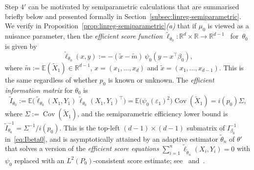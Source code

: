 \documentclass[a4paper]{article}
\newcommand{\R}{\mathbb{R}}
\newcommand{\E}{\mathbb{E}}
\DeclareMathOperator\Cov{Cov}
\theoremstyle{definition}
\begin{document}
Step $4'$ can be motivated by 
semiparametric calculations that are summarised briefly below and presented formally in Section~\ref{subsec:linreg-semiparametric}. We verify in Proposition~\ref{prop:linreg-semiparametric}\textit{(a)} that if $\mu_0$ is viewed as a nuisance parameter, then
the \textit{efficient score function} $\tilde{\ell}_{\theta_0} \colon \R^d \times \R \to \R^{d-1}$~\citep[Section~25.4]{vdV1998asymptotic} for~$\theta_0$ is given by
\begin{equation}
\label{eq:efficient-score}
\tilde{\ell}_{\theta_0}(x,y) := -(\tilde{x} - \tilde{m})\,\psi_0(y - x^\top\beta_0),
\end{equation}
where $\tilde{m} := \E(\tilde{X}_1) \in \R^{d-1}$, $x = (x_1,\ldots,x_d)$ and $\tilde{x} = (x_1,\ldots,x_{d-1})$. 
This is the same regardless of whether $p_0$ is known or unknown.
The \textit{efficient information matrix} for $\theta_0$ is
\begin{equation}
\label{eq:efficient-information-theta}
\tilde{I}_{\theta_0} := \E\bigl(\tilde{\ell}_{\theta_0}(X_1,Y_1)\,\tilde{\ell}_{\theta_0}(X_1,Y_1)^\top\bigr) = \E\bigl(\psi_0(\varepsilon_1)^2\bigr)\Cov(\tilde{X}_1) = i(p_0)\Sigma,
\end{equation}
where $\Sigma := \Cov(\tilde{X}_1)$, and the semiparametric efficiency lower bound \citep[e.g.][p.~367]{vdV1998asymptotic} is $\tilde{I}_{\theta_0}^{-1} = \Sigma^{-1}/i(p_0)$. This is the top-left $(d-1) \times (d-1)$ submatrix of $I_{\beta_0}^{-1}$ in~\eqref{eq:Ibeta0}, 
and is asymptotically attained by an adaptive estimator $\tilde{\theta}_n$ of $\theta'$ that solves a version of the \textit{efficient score equations} $\sum_{i=1}^n \tilde{\ell}_{\tilde{\theta}_n}(X_i,Y_i) = 0$ with $\psi_0$ replaced with an $L^2(P_0)$-consistent score estimate; see~\citet[Example~3]{bickel1982adaptive} and~\citet[Chapter~25.8]{vdV1998asymptotic}.
\end{document}
